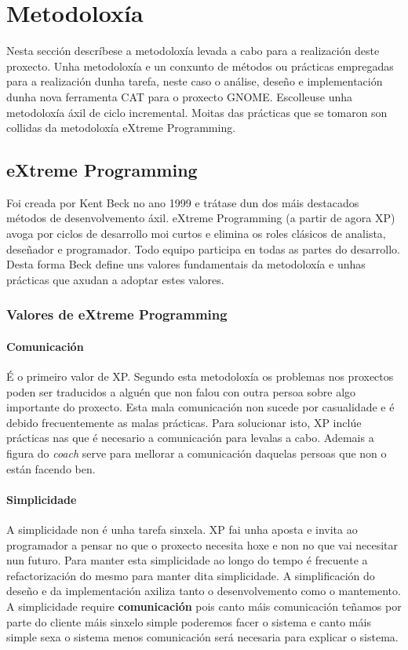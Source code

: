 \chapter{Metodoloxía}

Nesta sección descríbese a metodoloxía levada a cabo para a realización deste proxecto. Unha metodoloxía e un conxunto de métodos ou prácticas empregadas para a realización dunha tarefa, neste caso o análise, deseño e implementación dunha nova ferramenta CAT para o proxecto GNOME. Escolleuse unha metodoloxía áxil de ciclo incremental. Moitas das prácticas que se tomaron son collidas da metodoloxía eXtreme Programming.

\section{eXtreme Programming}

Foi creada por Kent Beck no ano 1999 e trátase dun dos máis destacados métodos de desenvolvemento áxil. eXtreme Programming (a partir de agora XP) avoga por ciclos de desarrollo moi curtos e elimina os roles clásicos de analista, deseñador e programador. Todo equipo participa en todas as partes do desarrollo. Desta forma Beck define uns valores fundamentais da metodoloxía e unhas prácticas que axudan a adoptar estes valores.

\subsection{Valores de eXtreme Programming}

\subsubsection{Comunicación}
É o primeiro valor de XP. Segundo esta metodoloxía os problemas nos proxectos poden ser traducidos a alguén que non falou con outra persoa sobre algo importante do proxecto. Esta mala comunicación non sucede por casualidade e é debido frecuentemente as malas prácticas. Para solucionar isto, XP inclúe prácticas nas que é necesario a comunicación para levalas a cabo. Ademais a figura do \emph{coach} serve para mellorar a comunicación daquelas persoas que non o están facendo ben.

\subsubsection{Simplicidade}

A simplicidade non é unha tarefa sinxela. XP fai unha aposta e invita ao programador a pensar no que o proxecto necesita hoxe e non no que vai necesitar nun futuro. Para manter esta simplicidade ao longo do tempo é frecuente a refactorización do mesmo para manter dita simplicidade. A simplificación do deseño e da implementación axiliza tanto o desenvolvemento como o mantemento. A simplicidade require \textbf{comunicación} pois canto máis comunicación teñamos por parte do cliente máis sinxelo simple poderemos facer o sistema e canto máis simple sexa o sistema menos comunicación será necesaria para explicar o sistema.

